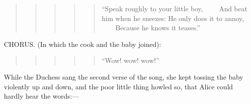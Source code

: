 \documentclass[11pt,openany,oneside]{book}
\begin{document}
\begin{quote}
\begin{quote}
\begin{quote}
\begin{quote}
\begin{quote}
{\small “Speak roughly to your little boy,}\newline
{\small  ~~~~And beat him when he sneezes:}\newline
{\small  He only does it to annoy,}\newline
{\small  ~~~~Because he knows it teases.” }

\end{quote}
\end{quote}
\end{quote}
\end{quote}
\end{quote}
{\centering CHORUS.\newline
 (In which the cook and the baby joined): 

}
\begin{quote}
\begin{quote}
\begin{quote}
\begin{quote}
\begin{quote}
{\small “Wow! wow! wow!” }

\end{quote}
\end{quote}
\end{quote}
\end{quote}
\end{quote}
While the Duchess sang the second verse of the song, she kept tossing the baby violently up and down, and the poor little thing howled so, that Alice could hardly hear the words:— 
\end{document}
